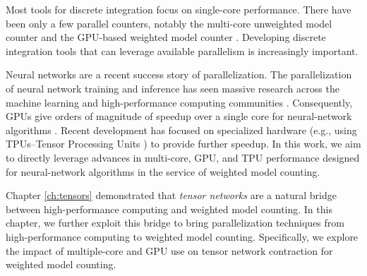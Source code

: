 Most tools for discrete integration focus on single-core performance. 
There have been only a few parallel counters, notably the multi-core unweighted model counter  \cite{BSB15} and the GPU-based weighted model counter  \cite{FHWZ18,FHZ19}.
Developing discrete integration tools that can leverage available parallelism is increasingly important. %


Neural networks are a recent success story of parallelization. The parallelization of neural network training and inference has seen massive research across the machine learning and high-performance computing communities \cite{ABCCDDDGII16,JYPPABBBBB17,PGMLJGKLGA19}. Consequently, GPUs give orders of magnitude of speedup over a single core for neural-network algorithms \cite{KSTKPPRS19,NRBHHJN15}. 
Recent development has focused on specialized hardware (e.g., using TPUs--Tensor Processing Units \cite{JYPPABBBBB17}) to provide further speedup.
In this work, we aim to directly leverage advances in multi-core, GPU, and TPU performance designed for neural-network algorithms in the service of weighted model counting. %

Chapter \ref{ch:tensors} demonstrated that \emph{tensor networks} are a natural bridge between high-performance computing and weighted model counting.
In this chapter, we further exploit this bridge to bring parallelization techniques from high-performance computing to weighted model counting. Specifically, we explore the impact of multiple-core and GPU use on tensor network contraction for weighted model counting.

